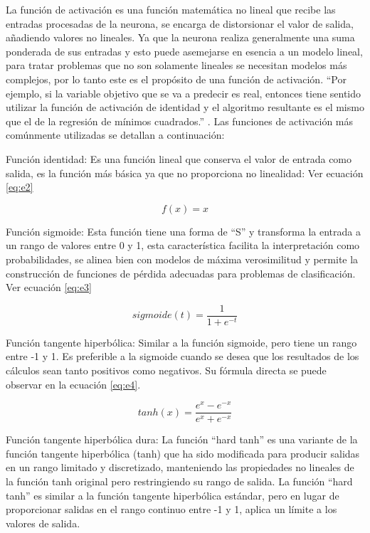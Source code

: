 La función de activación es una función matemática no lineal que recibe las entradas procesadas de la neurona, se encarga de distorsionar el valor de salida, añadiendo valores no lineales. Ya que la neurona realiza generalmente una suma ponderada de sus entradas y esto puede asemejarse en esencia a un modelo lineal, para tratar problemas que no son solamente lineales se necesitan modelos más complejos, por lo tanto este es el propósito de una función de activación. ``Por ejemplo, si la variable objetivo que se va a predecir es real, entonces tiene sentido utilizar la función de activación de identidad y el algoritmo resultante es el mismo que el de la regresión de mínimos cuadrados.'' \cite[p. 11]{aggarwal2018neural}. Las funciones de activación más comúnmente utilizadas se detallan a continuación:


Función identidad: Es una función lineal que conserva el valor de entrada como salida, es la función más básica ya que no proporciona no linealidad:  Ver ecuación \ref{eq:e2}

\begin{equation} \label{eq:e2} 
	f(x) = x 
\end{equation}


	
Función sigmoide: Esta función tiene una forma de ``S'' y transforma la entrada a un rango de valores entre 0 y 1, esta característica facilita la interpretación como probabilidades, se alinea bien con modelos de máxima verosimilitud y permite la construcción de funciones de pérdida adecuadas para problemas de clasificación. Ver ecuación \ref{eq:e3}

\begin{equation} \label{eq:e3} 
	sigmoide(t)=\frac{1}{1+e^{-t}}
\end{equation}

 
	
	
Función tangente hiperbólica: Similar a la función sigmoide, pero tiene un rango entre -1 y 1. Es preferible a la sigmoide cuando se desea que los resultados de los cálculos sean tanto positivos como negativos. Su fórmula directa se puede observar en la ecuación \ref{eq:e4}.
 

\begin{equation} \label{eq:e4} 
tanh(x) = \frac{e^{x}-e^{-x}}{e^{x}+e^{-x}}
\end{equation}
	
Función tangente hiperbólica dura: La función ``hard tanh'' es una variante de la función tangente hiperbólica (tanh) que ha sido modificada para producir salidas en un rango limitado y discretizado, manteniendo las propiedades no lineales de la función tanh original pero restringiendo su rango de salida.
La función ``hard tanh'' es similar a la función tangente hiperbólica estándar, pero en lugar de proporcionar salidas en el rango continuo entre -1 y 1, aplica un límite a los valores de salida.

